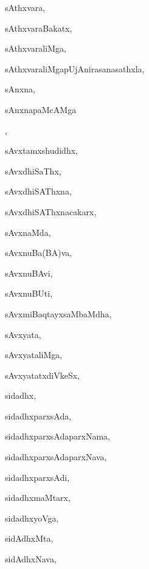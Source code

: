 \begin{multicols}{3}
{\noindent
{sAthxvara}, \pageref{sAthxvara}

\noindent
{sAthxvaraBakatx}, \pageref{sAthxvaraBakatx}

\noindent
{sAthxvaraliMga}, \pageref{sAthxvaraliMga}

\noindent
{sAthxvaraliMgapUjAnirasanasathxla}, \pageref{sAthxvaraliMgapUjAnirasanasathxla}

\noindent
{sAnxna}, \pageref{sAnxna}

\noindent
{sAnxnapaMcAMga}

\noindent
{}, \pageref{sAnxnapaMcAMgapaMcAMgasAnxna}

\noindent
{sAvxtamxshudidhx}, \pageref{sAvxtamxshudidhx}

\noindent
{sAvxdhiSaThx}, \pageref{sAvxdhiSaThx}

\noindent
{sAvxdhiSAThxna}, \pageref{sAvxdhiSAThxna}

\noindent
{sAvxdhiSAThxnacakarx}, \pageref{sAvxdhiSAThxnacakarx}

\noindent
{sAvxnaMda}, \pageref{sAvxnaMda}

\noindent
{sAvxnuBa(BA)va}, \pageref{sAvxnuBaBAva}

\noindent
{sAvxnuBAvi}, \pageref{sAvxnuBAvi}

\noindent
{sAvxnuBUti}, \pageref{sAvxnuBUti}

\noindent
{sAvxmiBaqtayxsaMbaMdha}, \pageref{sAvxmiBaqtayxsaMbaMdha}

\noindent
{sAvxyata}, \pageref{sAvxyata}

\noindent
{sAvxyataliMga}, \pageref{sAvxyataliMga}

\noindent
{sAvxyatatxdiVkeSx}, \pageref{sAvxyatatxdiVkeSx}

\noindent
{sidadhx}, \pageref{sidadhx}

\noindent
{sidadhxparxsAda}, \pageref{sidadhxparxsAda}

\noindent
{sidadhxparxsAdaparxNama}, \pageref{sidadhxparxsAdaparxNama}

\noindent
{sidadhxparxsAdaparxNava}, \pageref{sidadhxparxsAdaparxNava}

\noindent
{sidadhxparxsAdi}, \pageref{sidadhxparxsAdi}

\noindent
{sidadhxmaMtarx}, \pageref{sidadhxmaMtarx}

\noindent
{sidadhxyoVga}, \pageref{sidadhxyoVga}

\noindent
{sidAdhxMta}, \pageref{sidAdhxMta}

\noindent
{sidAdhxNava}, \pageref{sidAdhxNava}

}
\end{multicols}
